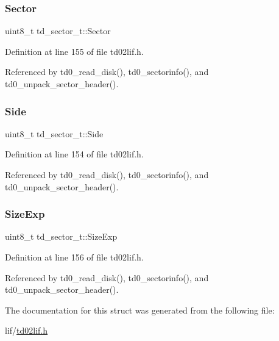 \subsubsection{\texorpdfstring{Sector}{Sector}}
{\footnotesize\ttfamily uint8\+\_\+t td\+\_\+sector\+\_\+t\+::\+Sector}



Definition at line 155 of file td02lif.\+h.



Referenced by td0\+\_\+read\+\_\+disk(), td0\+\_\+sectorinfo(), and td0\+\_\+unpack\+\_\+sector\+\_\+header().

\mbox{\label{structtd__sector__t_ae8f05b8d6e903e618f6adec8973221f7}} 
\subsubsection{\texorpdfstring{Side}{Side}}
{\footnotesize\ttfamily uint8\+\_\+t td\+\_\+sector\+\_\+t\+::\+Side}



Definition at line 154 of file td02lif.\+h.



Referenced by td0\+\_\+read\+\_\+disk(), td0\+\_\+sectorinfo(), and td0\+\_\+unpack\+\_\+sector\+\_\+header().

\mbox{\label{structtd__sector__t_addc6d434740a76aebde544a9beab1b6b}} 
\subsubsection{\texorpdfstring{Size\+Exp}{SizeExp}}
{\footnotesize\ttfamily uint8\+\_\+t td\+\_\+sector\+\_\+t\+::\+Size\+Exp}



Definition at line 156 of file td02lif.\+h.



Referenced by td0\+\_\+read\+\_\+disk(), td0\+\_\+sectorinfo(), and td0\+\_\+unpack\+\_\+sector\+\_\+header().



The documentation for this struct was generated from the following file\+:\begin{DoxyCompactItemize}
\item 
lif/\hyperlink{td02lif_8h}{td02lif.\+h}\end{DoxyCompactItemize}

